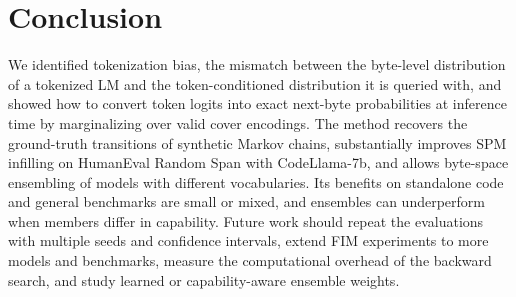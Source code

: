 \documentclass{article} %
\begin{document}
\section{Conclusion}
\label{sec:conclusion}
We identified tokenization bias, the mismatch between the byte-level distribution of a tokenized LM and the token-conditioned distribution it is queried with, and showed how to convert token logits into exact next-byte probabilities at inference time by marginalizing over valid cover encodings. The method recovers the ground-truth transitions of synthetic Markov chains, substantially improves SPM infilling on HumanEval Random Span with CodeLlama-7b, and allows byte-space ensembling of models with different vocabularies. Its benefits on standalone code and general benchmarks are small or mixed, and ensembles can underperform when members differ in capability. Future work should repeat the evaluations with multiple seeds and confidence intervals, extend FIM experiments to more models and benchmarks, measure the computational overhead of the backward search, and study learned or capability-aware ensemble weights.




\end{document}
